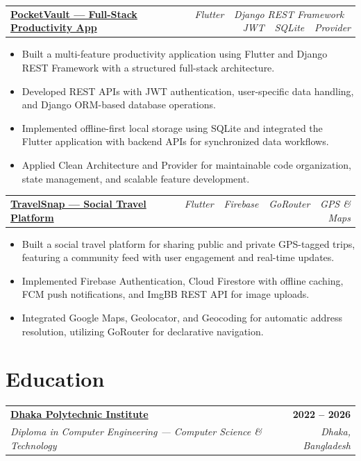 \documentclass[10.5pt, a4paper]{article}
\makeatletter
\newcommand{\eduentry}[4]{%
  \begin{tabularx}{\linewidth}{@{}X r@{}}
    \textbf{#1} & \textbf{\small\color{cnavy}#2} \\[1pt]
    \textit{\small\color{csteel}#3} & \textit{\small\color{csteel}#4}
  \end{tabularx}%
}
\newcommand{\projentry}[2]{%
  \vspace{3pt}%
  \begin{tabularx}{\linewidth}{@{}X r@{}}
    \textbf{#1} & {\small\itshape\color{csteel}#2}
  \end{tabularx}%
  \vspace{1pt}%
}
\makeatother
\begin{document}
\vspace{4pt}

\projentry{\href{https://github.com/SaidurRahman1004/pocketvault}{PocketVault --- Full-Stack Productivity App}}{Flutter \,\textbullet\, Django REST Framework \,\textbullet\, JWT \,\textbullet\, SQLite \,\textbullet\, Provider}
\begin{itemize}
  \item Built a multi-feature productivity application using Flutter and Django REST Framework with a structured full-stack architecture.
  \item Developed REST APIs with JWT authentication, user-specific data handling, and Django ORM-based database operations.
  \item Implemented offline-first local storage using SQLite and integrated the Flutter application with backend APIs for synchronized data workflows.
  \item Applied Clean Architecture and Provider for maintainable code organization, state management, and scalable feature development.
\end{itemize}

\vspace{4pt}

\projentry{\href{https://github.com/SaidurRahman1004/my_trips}{TravelSnap --- Social Travel Platform}}{Flutter \,\textbullet\, Firebase \,\textbullet\, GoRouter \,\textbullet\, GPS \& Maps}
\begin{itemize}
  \item Built a social travel platform for sharing public and private GPS-tagged trips, featuring a community feed with user engagement and real-time updates.
  \item Implemented Firebase Authentication, Cloud Firestore with offline caching, FCM push notifications, and ImgBB REST API for image uploads.
  \item Integrated Google Maps, Geolocator, and Geocoding for automatic address resolution, utilizing GoRouter for declarative navigation.
\end{itemize}

\section{Education}

\eduentry{\href{https://dhaka.polytech.gov.bd/}{Dhaka Polytechnic Institute}}{2022 -- 2026}{Diploma in Computer Engineering --- Computer Science \& Technology}{Dhaka, Bangladesh}
\end{document}

